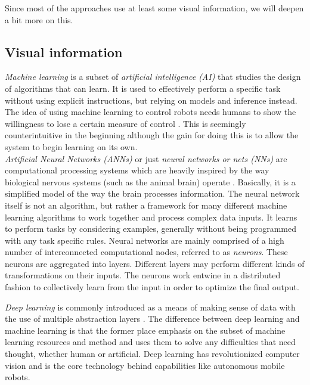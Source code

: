 \documentclass[12pt,a4paper]{report}
\newcommand{\term}{\textit}
\newcommand{\acronym}{\MakeUppercase}
\begin{document}
	
	Since most of the approaches use at least some visual information, we will 
	deepen a bit more on this.
	
	\subsection{Visual information}
	\label{sec:bg:data:neural}
	
	\term{Machine learning} is a subset of \term{artificial intelligence (\acronym{ai})} 
	that studies the design of algorithms that can learn. It is used to effectively 
	perform a specific task without using explicit instructions, but relying on 
	models and inference instead. The idea of using machine learning to control 
	robots needs humans to show the willingness to lose a certain measure of control 
	\citep{Shabbir}. This is seemingly counterintuitive in the beginning although the 
	gain for doing this is to allow the system to begin learning on its own.
	\\
	
	\term{Artificial Neural Networks (\acronym{ann}s)} or just \term{neural networks 
	or nets	(\acronym{nn}s)} are computational processing systems which are heavily 
	inspired by the way biological nervous systems (such as the animal brain) operate 
	\citep{Shea}. Basically, it is a simplified model of the way the brain processes 
	information. The neural network itself is not an algorithm, but rather a framework 
	for many different machine learning algorithms to work together and process 
	complex data inputs. It learns to perform tasks by considering examples, generally 
	without being programmed with any task specific rules. Neural networks are mainly 
	comprised of a high number of interconnected computational nodes, referred to as 
	\term{neurons}. These neurons are aggregated into layers. Different layers may 
	perform different kinds of transformations on their inputs. The neurons work 
	entwine in a distributed fashion to collectively learn from the input in order 
	to optimize the final output.
	\par
	\term{Deep learning} is commonly introduced as a means of making sense of data 
	with the use of multiple abstraction layers \citep{Shabbir}. The difference 
	between deep learning and machine learning is that the former place emphasis on 
	the subset of machine learning resources and method and uses them to solve any 
	difficulties that need thought, whether human or artificial. Deep learning has 
	revolutionized computer vision and is the core technology behind capabilities 
	like autonomous mobile robots.
	\\
	
\end{document}
